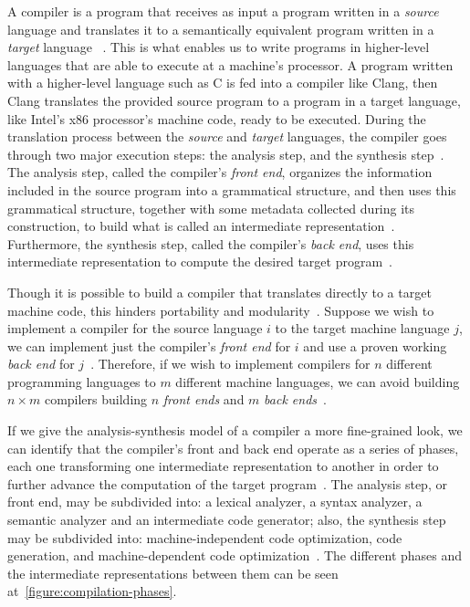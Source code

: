 \documentclass[
  oneside,
  english,
  coorientadorbanca,
  noabntexcite
]{ufsc-thesis-rn46-2019}
\begin{document}
A compiler is a program that receives as input a program written in a \textit{source} language and translates it to a semantically equivalent program written in a \textit{target} language
~\cite{Aho:2006:CPT:1177220}.
This is what enables us to write programs in higher-level languages that are able to execute at a machine's processor.
A program written with a higher-level language such as C is fed into a compiler like Clang, then Clang translates the provided source program to a program in a target language, like Intel's x86 processor's machine code, ready to be executed.
During the translation process between the \textit{source} and \textit{target} languages, the compiler goes through two major execution steps: the analysis step, and the synthesis step~\cite{Aho:2006:CPT:1177220}.
The analysis step, called the compiler's \textit{front end}, organizes the information included in the source program into a grammatical structure, and then uses this grammatical structure, together with some metadata collected during its construction, to build what is called an intermediate representation~\cite{Aho:2006:CPT:1177220}.
Furthermore, the synthesis step, called the compiler's \textit{back end}, uses this intermediate representation to compute the desired target program~\cite{Aho:2006:CPT:1177220}.

Though it is possible to build a compiler that translates directly to a target machine code, this hinders portability and modularity~\cite{appel2003modern}.
Suppose we wish to implement a compiler for the source language $i$ to the target machine language $j$, we can implement just the compiler's \textit{front end} for $i$ and use a proven working \textit{back end} for $j$~\cite{Aho:2006:CPT:1177220}.
Therefore, if we wish to implement compilers for $n$ different programming languages to $m$ different machine languages, we can avoid building $n \times m$ compilers building $n$ \textit{front ends} and $m$ \textit{back ends}~\cite{Aho:2006:CPT:1177220}.

If we give the analysis-synthesis model of a compiler a more fine-grained look, we can identify that the compiler's front and back end operate as a series of phases, each one transforming one intermediate representation to another in order to further advance the computation of the target program~\cite{Aho:2006:CPT:1177220}.
The analysis step, or front end, may be subdivided into: a lexical analyzer, a syntax analyzer, a semantic analyzer and an intermediate code generator; also, the synthesis step may be subdivided into: machine-independent code optimization, code generation, and machine-dependent code optimization~\cite{Aho:2006:CPT:1177220}.
The different phases and the intermediate representations between them can be seen at~\cref{figure:compilation-phases}.
\end{document}
